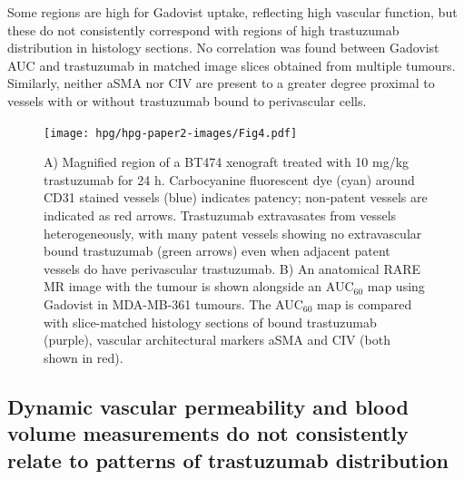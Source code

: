 Some regions are high for Gadovist uptake, reflecting high vascular function, but these do not consistently correspond with regions of high trastuzumab distribution in histology sections.
No correlation was found between Gadovist AUC and trastuzumab in matched image slices obtained from multiple tumours.
Similarly, neither \acs{aSMA} nor \acs{CIV} are present to a greater degree proximal to vessels with or without trastuzumab bound to perivascular cells.

\begin{figure}[htbp] %
  \centering
  \texttt{[image: hpg/hpg-paper2-images/Fig4.pdf]} 
  \caption{A) Magnified region of a \acs{BT474} xenograft treated with 10 mg/kg trastuzumab for 24 h. 
  Carbocyanine fluorescent dye (cyan) around CD31 stained vessels (blue) indicates patency; non-patent vessels are indicated as red arrows.
  Trastuzumab extravasates from vessels heterogeneously, with many patent vessels showing no extravascular bound trastuzumab (green arrows) even when adjacent patent vessels do have perivascular trastuzumab. 
  B) An anatomical RARE MR image with the tumour is shown alongside an \acs{AUC}$_{60}$ map using Gadovist in \acs{MDA-MB-361} tumours.
  The \acs{AUC}$_{60}$ map is compared with slice-matched histology sections of bound trastuzumab (purple), vascular architectural markers \acs{aSMA} and \acs{CIV} (both shown in red).}
  \label{hpgpaper2:fig4}
\end{figure}

\subsection{Dynamic vascular permeability and blood volume measurements do not consistently relate to patterns of trastuzumab distribution}

